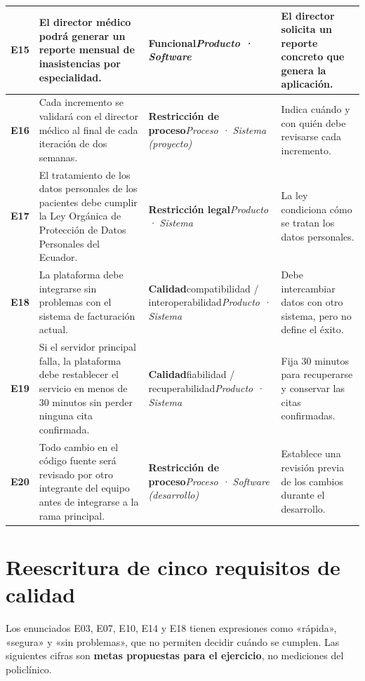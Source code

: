 \documentclass[10pt,a4paper,onecolumn]{IEEEtran}
\begin{document}
\begin{longtable}{@{}>{\raggedright\arraybackslash}p{.8cm}>{\raggedright\arraybackslash}p{5.25cm}>{\raggedright\arraybackslash}p{4.55cm}>{\raggedright\arraybackslash}p{4.55cm}@{}}
\textbf{E15} & El director médico podrá generar un reporte mensual de inasistencias por especialidad. & \textbf{Funcional}\newline \emph{Producto · Software} & El director solicita un reporte concreto que genera la aplicación. \\ \midrule
\textbf{E16} & Cada incremento se validará con el director médico al final de cada iteración de dos semanas. & \textbf{Restricción de proceso}\newline \emph{Proceso · Sistema (proyecto)} & Indica cuándo y con quién debe revisarse cada incremento. \\ \midrule
\textbf{E17} & El tratamiento de los datos personales de los pacientes debe cumplir la Ley Orgánica de Protección de Datos Personales del Ecuador. & \textbf{Restricción legal}\newline \emph{Producto · Sistema} & La ley condiciona cómo se tratan los datos personales. \\ \midrule
\textbf{E18} & La plataforma debe integrarse sin problemas con el sistema de facturación actual. & \textbf{Calidad}\newline compatibilidad / interoperabilidad\newline \emph{Producto · Sistema} & Debe intercambiar datos con otro sistema, pero no define el éxito. \\ \midrule
\textbf{E19} & Si el servidor principal falla, la plataforma debe restablecer el servicio en menos de 30 minutos sin perder ninguna cita confirmada. & \textbf{Calidad}\newline fiabilidad / recuperabilidad\newline \emph{Producto · Sistema} & Fija 30 minutos para recuperarse y conservar las citas confirmadas. \\ \midrule
\textbf{E20} & Todo cambio en el código fuente será revisado por otro integrante del equipo antes de integrarse a la rama principal. & \textbf{Restricción de proceso}\newline \emph{Proceso · Software (desarrollo)} & Establece una revisión previa de los cambios durante el desarrollo. \\ \midrule
\end{longtable}
\normalsize
\section{Reescritura de cinco requisitos de calidad}
Los enunciados E03, E07, E10, E14 y E18 tienen expresiones como «rápida», «segura» y «sin problemas», que no permiten decidir cuándo se cumplen. Las siguientes cifras son \textbf{metas propuestas para el ejercicio}, no mediciones del policlínico.
\end{document}
